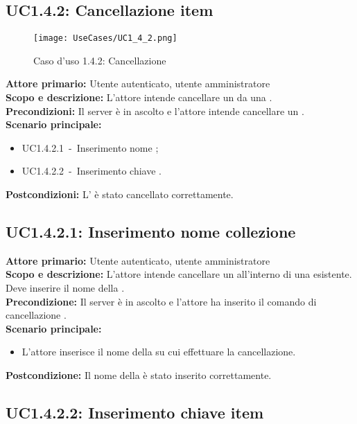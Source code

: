 \documentclass{scalatekids-article}
\begin{document}
\subsection{UC1.4.2: Cancellazione item}

\begin{figure}[H]
  \begin{center}
    \texttt{[image: UseCases/UC1\_4\_2.png]}
    \caption*{Caso d'uso 1.4.2: Cancellazione }
  \end{center}
\end{figure}
\textbf{Attore primario:} Utente autenticato, utente amministratore\\
\textbf{Scopo e descrizione:} L'attore intende cancellare un  da una .\\
\textbf{Precondizioni:} Il server è in ascolto e l'attore intende cancellare un .\\
\textbf{Scenario principale:}
\begin{itemize}
\item UC1.4.2.1\ -\ Inserimento nome ;
\item UC1.4.2.2\ -\ Inserimento chiave .
\end{itemize}
\textbf{Postcondizioni:} L' è stato cancellato correttamente.

\subsection{UC1.4.2.1: Inserimento nome collezione}

\textbf{Attore primario:} Utente autenticato, utente amministratore\\
\textbf{Scopo e descrizione:} L'attore intende cancellare un  all'interno di una  esistente. Deve inserire il nome della .\\
\textbf{Precondizione:} Il server è in ascolto e l'attore ha inserito il comando di cancellazione .\\
\textbf{Scenario principale:}
\begin{itemize}
\item L'attore inserisce il nome della  su cui effettuare la cancellazione.
\end{itemize}
\textbf{Postcondizione:} Il nome della  è stato inserito correttamente.

\subsection{UC1.4.2.2: Inserimento chiave item}
\end{document}
